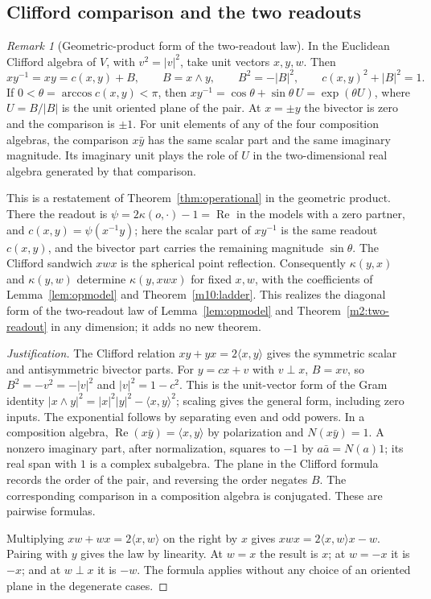 \documentclass[11pt,reqno]{amsart}
\theoremstyle{definition}
\theoremstyle{remark}
\newtheorem{remark}[theorem]{Remark}
\numberwithin{equation}{section}
\newcommand{\re}{\operatorname{Re}}
\newcommand{\ip}[2]{\langle #1,#2\rangle}
\begin{document}
\subsection{Clifford comparison and the two readouts}

\begin{remark}[Geometric-product form of the two-readout law]\label{m10:clifford}
In the Euclidean Clifford algebra of \(V\), with \(v^2=|v|^2\), take
unit vectors \(x,y,w\). Then
\[
 xy^{-1}=xy=c(x,y)+B,\qquad B=x\wedge y,\qquad
 B^2=-|B|^2,\qquad c(x,y)^2+|B|^2=1.
\]
If \(0<\theta=\arccos c(x,y)<\pi\), then
\(xy^{-1}=\cos\theta+\sin\theta\,U=\exp(\theta U)\), where
\(U=B/|B|\) is the unit oriented plane of the pair. At \(x=\pm y\)
the bivector is zero and the comparison is \(\pm1\). For unit
elements of any of the four composition algebras, the comparison
\(x\bar y\) has the same scalar part and the same imaginary
magnitude. Its imaginary unit plays the role of \(U\) in the
two-dimensional real algebra generated by that comparison.

This is a restatement of Theorem~\ref{thm:operational} in the
geometric product. There the readout is
\(\psi=2\kappa(o,\cdot)-1=\re\) in the models with a zero partner, and
\(c(x,y)=\psi(x^{-1}y)\); here the scalar part of \(xy^{-1}\) is
the same readout \(c(x,y)\), and the bivector part carries the
remaining magnitude \(\sin\theta\). The Clifford sandwich \(xwx\) is
the spherical point reflection. Consequently \(\kappa(y,x)\) and
\(\kappa(y,w)\) determine \(\kappa(y,xwx)\) for fixed \(x,w\), with
the coefficients of Lemma~\ref{lem:opmodel} and
Theorem~\ref{m10:ladder}. This realizes the diagonal form of the
two-readout law of Lemma~\ref{lem:opmodel} and
Theorem~\ref{m2:two-readout} in any dimension; it adds no new theorem.
\end{remark}

\begin{proof}[Justification]
The Clifford relation \(xy+yx=2\ip{x}{y}\) gives the symmetric
scalar and antisymmetric bivector parts. For \(y=cx+v\) with
\(v\perp x\), \(B=xv\), so \(B^2=-v^2=-|v|^2\) and
\(|v|^2=1-c^2\). This is the unit-vector form of the Gram identity
\(|x\wedge y|^2=|x|^2|y|^2-\ip{x}{y}^2\); scaling gives the
general form, including zero inputs. The exponential follows
by separating even and odd powers. In a composition algebra,
\(\re(x\bar y)=\ip{x}{y}\) by polarization and \(N(x\bar y)=1\).
A nonzero imaginary part, after normalization, squares to
\(-1\) by \(a\bar a=N(a)1\); its real span with \(1\) is a
complex subalgebra. The plane in the Clifford formula records
the order of the pair, and reversing the order negates \(B\).
The corresponding comparison in a composition algebra is
conjugated. These are pairwise formulas.

Multiplying \(xw+wx=2\ip{x}{w}\) on the right by \(x\) gives
\(xwx=2\ip{x}{w}x-w\). Pairing with \(y\) gives the law by
linearity. At \(w=x\) the result is \(x\); at \(w=-x\) it is
\(-x\); and at \(w\perp x\) it is \(-w\). The formula applies
without any choice of an oriented plane in the degenerate cases.
\end{proof}
\end{document}
